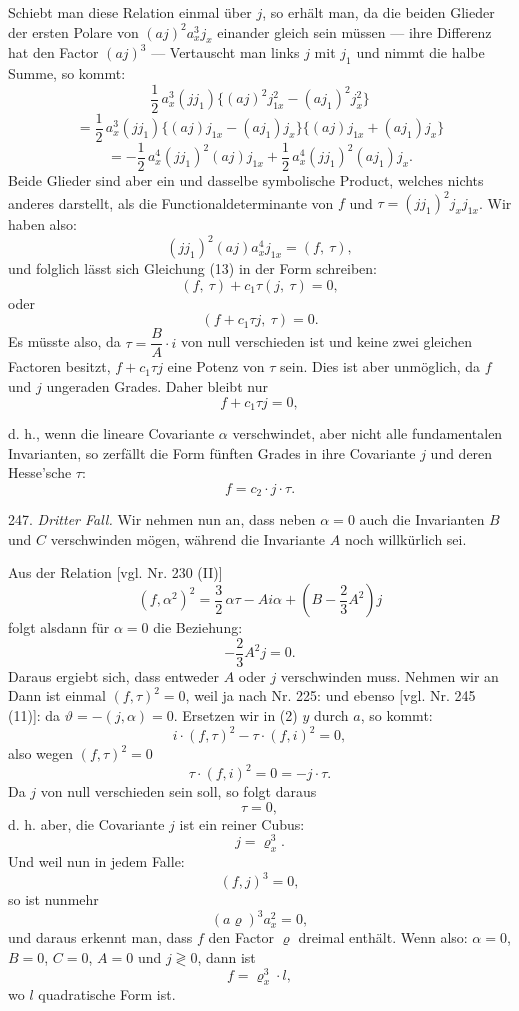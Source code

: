 Schiebt man diese Relation einmal \"uber $j$, so erh\"alt man, da die beiden Glieder der ersten Polare von $(aj)^2 a_x^3 j_x$ einander gleich sein m\"ussen --- ihre Differenz hat den Factor $(aj)^3$ ---
Vertauscht man links $j$ mit $j_1$ und nimmt die halbe Summe, so kommt:
\[
\frac{1}{2}\,a_x^3(jj_1)\{(aj)^2 j_{1x}^2 - (aj_1)^2 j_x^2\}
\]
\[
= \frac{1}{2}\,a_x^3(jj_1)\{(aj)j_{1x} - (aj_1)j_x\}\{(aj)j_{1x} + (aj_1)j_x\}
\]
\[
= -\frac{1}{2}\,a_x^4(jj_1)^2(aj)j_{1x} + \frac{1}{2}\,a_x^4(jj_1)^2(aj_1)j_x.
\]
Beide Glieder sind aber ein und dasselbe symbolische Product, welches nichts anderes darstellt, als die Functionaldeterminante von $f$ und $\tau=(jj_1)^2 j_x j_{1x}$. Wir haben also:
\[
(jj_1)^2(aj)a_x^4 j_{1x} = (f,\ \tau),
\]
und folglich l\"asst sich Gleichung (13) in der Form schreiben:
\[
(f,\ \tau) + c_1\tau(j,\ \tau) = 0,
\]
oder
\[
(f + c_1\tau j,\ \tau) = 0.
\]
Es m\"usste also, da $\tau = \dfrac{B}{A}\cdot i$ von null verschieden ist %
und keine zwei gleichen Factoren besitzt, $f+c_1\tau j$ eine Potenz von $\tau$ sein. Dies ist aber unm\"oglich, da $f$ und $j$ ungeraden Grades. Daher bleibt nur
\[
f + c_1\tau j = 0,
\]


d. h., wenn die lineare Covariante $\alpha$ verschwindet, aber nicht alle
fundamentalen Invarianten, so zerfällt die Form fünften Grades in ihre
Covariante $j$ und deren Hesse'sche $\tau$:
\[
f = c_2 \cdot j \cdot \tau .
\]

247. \textit{Dritter Fall.} Wir nehmen nun an, dass neben $\alpha = 0$ auch
die Invarianten $B$ und $C$ verschwinden mögen, während die Invariante $A$
noch willkürlich sei.

Aus der Relation [vgl. Nr. 230 (II)]
\[
(f,\alpha^2)^2 = \frac{3}{2}\,\alpha\tau - Ai\alpha + \left(B - \frac{2}{3}A^2\right) j
\]
folgt alsdann für $\alpha = 0$ die Beziehung:
\[
-\frac{2}{3}A^2 j = 0.
\]
Daraus ergiebt sich, dass entweder $A$ oder $j$ verschwinden muss. Nehmen wir an
Dann ist einmal $(f,\tau)^2 = 0$, weil ja nach Nr. 225:
und ebenso [vgl. Nr. 245 (11)]:
da $\vartheta = -(j,\alpha) = 0$. Ersetzen wir in (2) $y$ durch $a$, so kommt:
\[
i\cdot(f,\tau)^2 - \tau\cdot(f,i)^2 = 0,
\]
also wegen $(f,\tau)^2 = 0$
\[
\tau\cdot(f,i)^2 = 0 = -j\cdot\tau .
\]
Da $j$ von null verschieden sein soll, so folgt daraus
\[
\tau = 0,
\]
d. h. aber, die Covariante $j$ ist ein reiner Cubus:
\[
j = \varrho_x^3 .
\]
Und weil nun in jedem Falle:
\[
(f,j)^3 = 0,
\]
so ist nunmehr
\[
(a\varrho)^3 a_x^2 = 0,
\]
und daraus erkennt man, dass $f$ den Factor $\varrho$ dreimal enthält. Wenn
also: $\alpha = 0$, $B = 0$, $C = 0$, $A = 0$ und $j \gtrless 0$, dann ist
\[
f = \varrho_x^3 \cdot l,
\]
wo $l$ quadratische Form ist.


